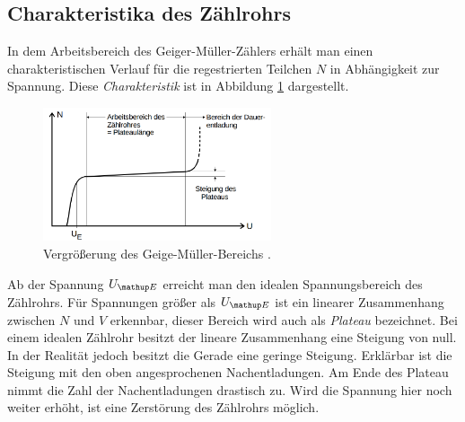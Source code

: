 \subsection{Charakteristika des Zählrohrs}
In dem Arbeitsbereich des Geiger-Müller-Zählers erhält man einen
charakteristischen Verlauf für die regestrierten Teilchen $N$ in Abhängigkeit zur Spannung. %
Diese \emph{Charakteristik} ist in Abbildung \ref{fig: plateau} dargestellt.
\begin{figure}
  \centering
  \includegraphics[width=0.6\textwidth]{bilder/pleateu.png}
  \caption{Vergrößerung des Geige-Müller-Bereichs \cite{anleitung703}.}
  \label{fig: plateau}
\end{figure}
Ab der Spannung $U\ua{E}$ erreicht man den idealen Spannungsbereich des Zählrohrs. %
Für Spannungen größer als $U\ua{E}$ ist ein
linearer Zusammenhang zwischen $N$ und $V$ erkennbar, dieser Bereich wird auch als
\emph{Plateau} bezeichnet. Bei einem idealen Zählrohr besitzt der
lineare Zusammenhang eine Steigung von null. In der Realität jedoch besitzt
die Gerade eine geringe Steigung. Erklärbar ist die Steigung mit den oben angesprochenen Nachentladungen. %
Am Ende des Plateau nimmt die
Zahl der Nachentladungen drastisch zu. Wird die Spannung hier noch weiter erhöht, %
ist eine Zerstörung des Zählrohrs möglich.

